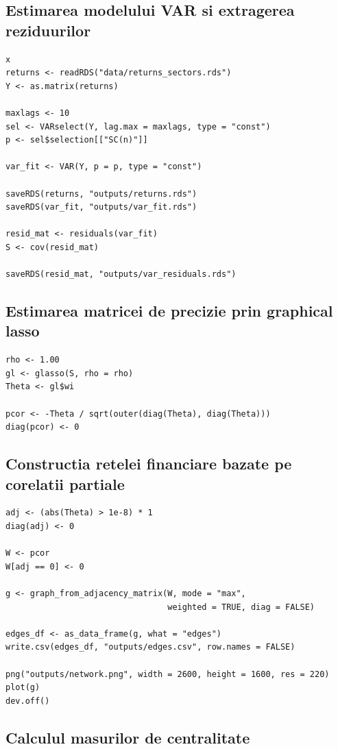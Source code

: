 \subsection{Estimarea modelului VAR si extragerea reziduurilor}

\begin{verbatim}x
returns <- readRDS("data/returns_sectors.rds")
Y <- as.matrix(returns)

maxlags <- 10
sel <- VARselect(Y, lag.max = maxlags, type = "const")
p <- sel$selection[["SC(n)"]]

var_fit <- VAR(Y, p = p, type = "const")

saveRDS(returns, "outputs/returns.rds")
saveRDS(var_fit, "outputs/var_fit.rds")

resid_mat <- residuals(var_fit)
S <- cov(resid_mat)

saveRDS(resid_mat, "outputs/var_residuals.rds")
\end{verbatim}

\subsection{Estimarea matricei de precizie prin graphical lasso}

\begin{verbatim}
rho <- 1.00
gl <- glasso(S, rho = rho)
Theta <- gl$wi

pcor <- -Theta / sqrt(outer(diag(Theta), diag(Theta)))
diag(pcor) <- 0
\end{verbatim}

\subsection{Constructia retelei financiare bazate pe corelatii partiale}

\begin{verbatim}
adj <- (abs(Theta) > 1e-8) * 1
diag(adj) <- 0

W <- pcor
W[adj == 0] <- 0

g <- graph_from_adjacency_matrix(W, mode = "max",
                                 weighted = TRUE, diag = FALSE)

edges_df <- as_data_frame(g, what = "edges")
write.csv(edges_df, "outputs/edges.csv", row.names = FALSE)

png("outputs/network.png", width = 2600, height = 1600, res = 220)
plot(g)
dev.off()
\end{verbatim}

\subsection{Calculul masurilor de centralitate}

